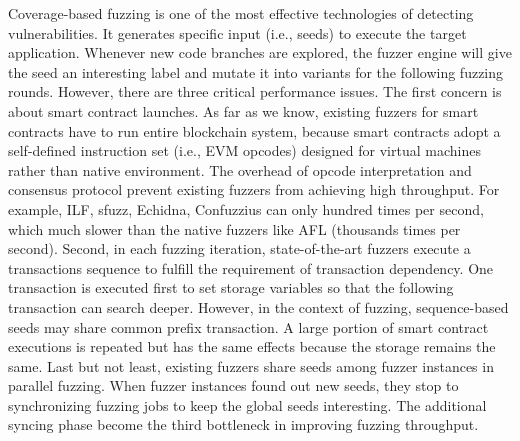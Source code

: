 Coverage-based fuzzing is one of the most effective technologies of detecting vulnerabilities\cite{fuzzingsurvey}. 
It generates specific input (i.e., seeds) to execute the target application.
Whenever new code branches are explored, the fuzzer engine will give the seed an interesting label and mutate it into variants for the following fuzzing rounds.
However, there are three critical performance issues.
%
The first concern is about smart contract launches. 
As far as we know, existing fuzzers for smart contracts have to run entire blockchain system, because smart contracts adopt a self-defined instruction set (i.e., EVM opcodes) designed for virtual machines rather than native environment. 
The overhead of opcode interpretation and consensus protocol prevent existing fuzzers from achieving high throughput. 
For example, ILF\cite{ilf_ccs}, sfuzz\cite{sfuzz_icse}, Echidna\cite{echidna_issta}, Confuzzius\cite{confuzzius_eurosp} can only hundred times per second, which much slower than the native fuzzers like AFL\cite{afl} (thousands times per second).
%
Second, in each fuzzing iteration, state-of-the-art fuzzers execute a transactions sequence to fulfill the requirement of transaction dependency\cite{confuzzius_eurosp}.
One transaction is executed first to set storage variables so that the following transaction can search deeper. 
However, in the context of fuzzing, sequence-based seeds may share common prefix transaction.
A large portion of smart contract executions is repeated but has the same effects because the storage remains the same. 
%
Last but not least, existing fuzzers share seeds among fuzzer instances in parallel fuzzing.
When fuzzer instances found out new seeds, they stop to synchronizing fuzzing jobs to keep the global seeds interesting.
The additional syncing phase become the third bottleneck in improving fuzzing throughput. 

